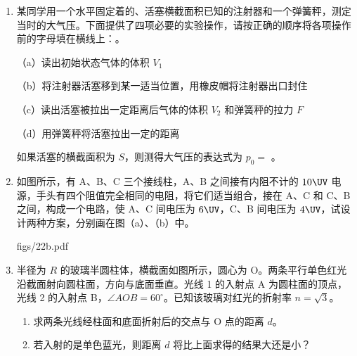 \documentclass[\gkver]{gaokaozhenti}
\begin{document}
\begin{enumerate}

\item
某同学用一个水平固定着的、活塞横截面积已知的注射器和一个弹簧秤，测定当时的大气压。下面提供了四项必要的实验操作，请按正确的顺序将各项操作前的字母填在横线上：。

（a）读出初始状态气体的体积 $V_{1}$

（b）将注射器活塞移到某一适当位置，用橡皮帽将注射器出口封住

（c）读出活塞被拉出一定距离后气体的体积 $V_{2}$ 和弹簧秤的拉力 $F$

（d）用弹簧秤将活塞拉出一定的距离

如果活塞的横截面积为 $S$，则测得大气压的表达式为 $p_{0} =$ 。


\item
如图所示，有 A、B、C 三个接线柱，A、B 之间接有内阻不计的 $10\UV$ 电源，手头有四个阻值完全相同的电阻，将它们适当组合，接在 A、C 和 C、B 之间，构成一个电路，使 A、C 间电压为 $6\UV$，C、B 间电压为 $4\UV$，试设计两种方案，分别画在图（a）、（b）中。

{figs/22b.pdf}


\item
半径为 $R$ 的玻璃半圆柱体，横截面如图所示，圆心为 O。两条平行单色红光沿截面射向圆柱面，方向与底面垂直。光线 1 的入射点 A 为圆柱面的顶点，光线 2 的入射点 B，$\angle AOB = 60^{\circ}$。已知该玻璃对红光的折射率 $n = \sqrt{3}$。
\begin{enumerate}
	\item
	求两条光线经柱面和底面折射后的交点与 O 点的距离 $d$。
	\item
	若入射的是单色蓝光，则距离 $d$ 将比上面求得的结果大还是小？
\end{enumerate}


\end{enumerate}
\end{document}
